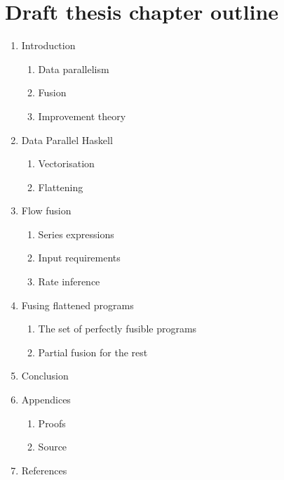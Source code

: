 \documentclass[12pt,a4paper]{article}
\begin{document}
\pagebreak
\section{Draft thesis chapter outline}

\begin{enumerate}
\item Introduction
  \begin{enumerate}
  \item Data parallelism
  \item Fusion
  \item Improvement theory
  \end{enumerate}

\item Data Parallel Haskell
  \begin{enumerate}
  \item Vectorisation
  \item Flattening
  \end{enumerate}

\item Flow fusion
  \begin{enumerate}
  \item Series expressions
  \item Input requirements
  \item Rate inference
  \end{enumerate}

\item Fusing flattened programs
  \begin{enumerate}
  \item The set of perfectly fusible programs
  \item Partial fusion for the rest
  \end{enumerate}

\item Conclusion
\item Appendices
  \begin{enumerate}
  \item Proofs
  \item Source
  \end{enumerate}
\item References
\end{enumerate}

\pagebreak

%


\end{document}
